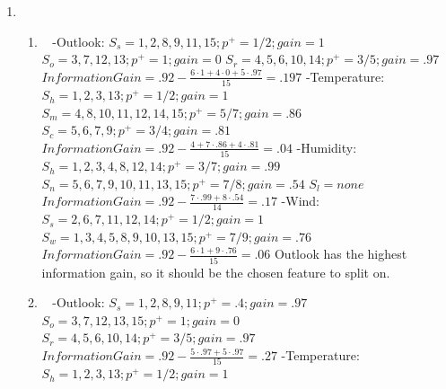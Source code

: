 \documentclass[12pt, fullpage,letterpaper]{article}
\begin{document}
\begin{enumerate}
\item~ 
\begin{enumerate}
\item~
\newline -Outlook:
	\newline $S_s = 1, 2,8, 9, 11, 15; p^+=1/2; gain=1$
	\newline $S_o=3, 7, 12, 13; p^+ = 1;  gain=0$
	\newline $S_r=4, 5, 6, 10, 14; p^+=3/5;  gain=.97$
	\newline $Information Gain=.92-\frac{6\cdot1+4\cdot0+5\cdot.97}{15}=.197$
	\newline -Temperature:
	\newline $S_h = 1, 2, 3, 13; p^+=1/2; gain=1$
	\newline $S_m=4, 8, 10, 11, 12, 14, 15; p^+=5/7; gain=.86$
	\newline $S_c=5, 6, 7, 9; p^+=3/4;  gain=.81$
	\newline $Information Gain=.92-\frac{4+7\cdot.86+4\cdot.81}{15}=.04$
	\newline -Humidity:
	\newline $S_h = 1, 2, 3, 4, 8, 12, 14; p^+=3/7;  gain=.99$
	\newline $S_n=5, 6, 7, 9, 10, 11, 13, 15; p^+=7/8;  gain=.54$
	\newline $S_l=none$
	\newline $Information Gain=.92-\frac{7\cdot.99+8\cdot.54}{14}=.17$
	\newline -Wind:
	\newline $S_s = 2, 6, 7, 11, 12, 14; p^+=1/2;  gain=1$
	\newline $S_w=1, 3, 4, 5, 8, 9, 10, 13, 15; p^+=7/9; gain=.76$
	\newline $Information Gain=.92-\frac{6\cdot1+9\cdot.76}{15}=.06$
	\newline
	\newline Outlook has the highest information gain, so it should be the chosen feature to split on. 
\item~
\newline -Outlook:
	\newline $S_s = 1, 2,8, 9, 11; p^+=.4;  gain=.97$
	\newline $S_o=3, 7, 12, 13, 15; p^+ = 1;  gain=0$
	\newline $S_r=4, 5, 6, 10, 14; p^+=3/5;  gain=.97$
	\newline $Information Gain=.92-\frac{5\cdot.97+5\cdot.97}{15}=.27$
	\newline -Temperature:
	\newline $S_h = 1, 2, 3, 13; p^+=1/2;  gain=1$

\end{enumerate}
\end{enumerate}
\end{document}

